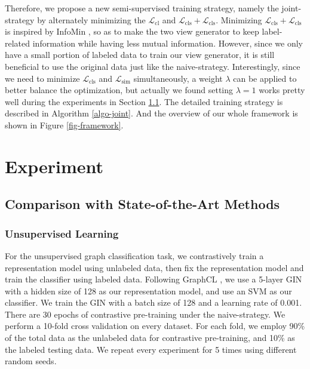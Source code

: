 Therefore, we propose a new semi-supervised training strategy, namely the joint-strategy by alternately minimizing the $\mathcal{L}_{\text{cl}}$ and $\mathcal{L}_{\text{cls}} + \mathcal{L}_{\text{cls}}$. Minimizing $\mathcal{L}_{\text{cls}} + \mathcal{L}_{\text{cls}}$ is inspired by InfoMin \cite{tian2020goodview}, so as to make the two view generator to keep label-related information while having less mutual information. 
However, since we only have a small portion of labeled data to train our view generator, it is still beneficial to use the original data just like the naive-strategy. Interestingly, since we need to minimize $\mathcal{L}_{\text{cls}}$ and $\mathcal{L}_{\text{sim}}$ simultaneously, a weight $\lambda$ can be applied to better balance the optimization, but actually we found setting $\lambda=1$ works pretty well during the experiments in Section \ref{sec-sota}. The detailed training strategy is described in Algorithm \ref{algo-joint}. And the overview of our whole framework is shown in Figure \ref{fig-framework}.

\section{Experiment}

\subsection{Comparison with State-of-the-Art Methods}
\label{sec-sota}
    
\subsubsection{Unsupervised Learning}

For the unsupervised graph classification task, we contrastively train a representation model using unlabeled data, then fix the representation model and train the classifier using labeled data. Following GraphCL \cite{you2020graphcl}, we use a 5-layer GIN with a hidden size of 128 as our representation model, and use an SVM as our classifier. We train the GIN with a batch size of 128 and a learning rate of 0.001. There are 30 epochs of contrastive pre-training under the naive-strategy. We perform a 10-fold cross validation on every dataset. For each fold, we employ 90\% of the total data as the unlabeled data for contrastive pre-training, and 10\% as the labeled testing data. We repeat every experiment for 5 times using different random seeds. 

